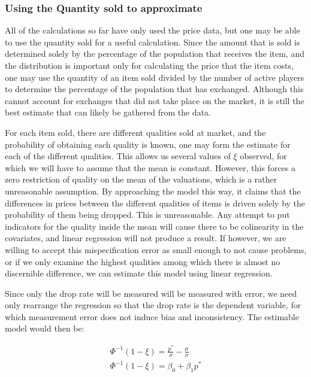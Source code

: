 \documentclass[12pt, letterpaper]{paper}
\begin{document}
\subsubsection{Using the Quantity sold to approximate}
\label{sec-2-2-3}

All of the calculations so far have only used the price data, but one
may be able to use the quantity sold for a useful calculation. Since
the amount that is sold is determined solely by the percentage of the
population that receives the item, and the distribution is important
only for calculating the price that the item costs, one may use the
quantity of an item sold divided by the number of active players to
determine the percentage of the population that has
exchanged. Although this cannot account for exchanges that did not
take place on the market, it is still the best estimate that can
likely be gathered from the data.

For each item sold, there are different qualities
sold at market, and the probability of obtaining each quality is
known, one may form the estimate for each of the different
qualities. This allows us several values of $\xi$ observed, for which we
will have to assume that the mean is constant. However, this forces a
zero restriction of quality on the mean of the valuations, which is a
rather unreasonable assumption. By approaching the model this way, it
claims that the differences in prices between the different qualities
of items is driven solely by the probability of them being
dropped. This is unreasonable. Any attempt to put indicators for the
quality inside the mean will cause there to be colinearity in the
covariates, and linear regression will not produce a result. 
If however, we are willing to accept this mispecification error as
small enough to not cause problems, or if we only examine the highest
qualities among which there is almost no discernible difference, we
can estimate this model using linear regression. 

Since only the drop rate will be measured will be measured with error,
we need only rearrange the regression so that the drop rate is the
dependent variable, for which measurement error does not induce bias
and inconsistency. The estimable model would then be:

\begin{align*}
\Phi^{-1} ( 1- \xi ) = \frac{p^*}{\sigma} - \frac{\mu}{\sigma} \\
\Phi^{-1} ( 1- \xi ) = \beta_0 + \beta_1 p^* \\
\end{align*}
\end{document}
